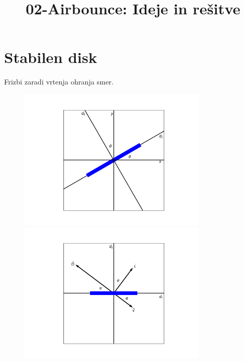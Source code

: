 \documentclass[11pt,a4paper]{article}
\title{02-Airbounce: Ideje in rešitve}
\date{}
\begin{document}
\maketitle

\section{Stabilen disk}
Frizbi zaradi vrtenja ohranja smer.

\begin{figure}[H]
	\centering
	\begin{minipage}{.5\textwidth}
	  \centering
	  \includegraphics[width=9cm]{graf_osi.png}
	\end{minipage}%
	\begin{minipage}{.5\textwidth}
	  \centering
	  \includegraphics[width=9cm]{osi_frisbeeja.png}
	\end{minipage}
	\end{figure}
\end{document}

